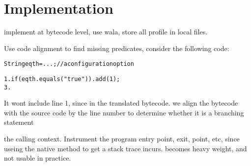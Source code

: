 \section{Implementation}
\label{sec:implementation}

implement at bytecode level, use wala, store all profile in local files.

Use code alignment to find missing predicates, consider the following code:

\begin{CodeOut}
\begin{alltt}
  String eqth = ...; //a configuration option

1. if (eqth.equals("true")) .   add(1);
3. \ttrcb
\end{alltt}
\end{CodeOut}

It wont include  line 1, since in the translated bytecode.
we align the bytecode with the source code by the line number to
determine whether it is a branching statement


the calling context. Instrument the program entry point, exit, point, etc,
since useing the native method to get a stack trace incurs.
becomes heavy weight, and not usable in practice.

